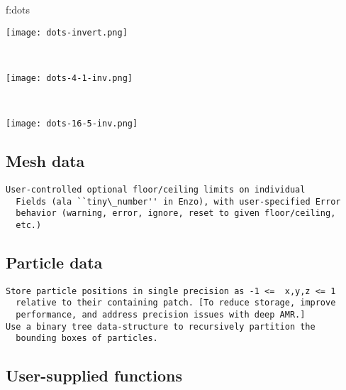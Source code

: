 \documentclass{article}
\begin{document}
{f:dots}{
\begin{minipage}{7.0in}
\begin{minipage}{2.2in}
\texttt{[image: dots-invert.png]}
\end{minipage} \ 
\begin{minipage}{2.2in}
\texttt{[image: dots-4-1-inv.png]}
\end{minipage} \ 
\begin{minipage}{2.2in}
\texttt{[image: dots-16-5-inv.png]}
\end{minipage}
\end{minipage}}



\subsection{Mesh data}

\begin{verbatim}
User-controlled optional floor/ceiling limits on individual
  Fields (ala ``tiny\_number'' in Enzo), with user-specified Error
  behavior (warning, error, ignore, reset to given floor/ceiling,
  etc.)
\end{verbatim}

\subsection{Particle data}

\begin{verbatim}
Store particle positions in single precision as -1 <=  x,y,z <= 1
  relative to their containing patch. [To reduce storage, improve
  performance, and address precision issues with deep AMR.]
Use a binary tree data-structure to recursively partition the
  bounding boxes of particles.
\end{verbatim}

\subsection{User-supplied functions}
\end{document}
